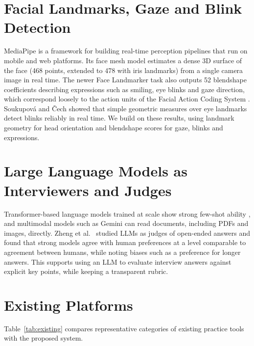 \documentclass[12pt,a4paper,oneside]{report}
\begin{document}
\section{Facial Landmarks, Gaze and Blink Detection}
MediaPipe \cite{lugaresi2019} is a framework for building real-time perception pipelines that run on mobile and web platforms. Its face mesh model \cite{kartynnik2019} estimates a dense 3D surface of the face (468 points, extended to 478 with iris landmarks) from a single camera image in real time. The newer Face Landmarker task also outputs 52 blendshape coefficients describing expressions such as smiling, eye blinks and gaze direction, which correspond loosely to the action units of the Facial Action Coding System \cite{ekman1978}. Soukupov\'{a} and \v{C}ech \cite{soukupova2016} showed that simple geometric measures over eye landmarks detect blinks reliably in real time. We build on these results, using landmark geometry for head orientation and blendshape scores for gaze, blinks and expressions.

\section{Large Language Models as Interviewers and Judges}
Transformer-based language models \cite{vaswani2017} trained at scale show strong few-shot ability \cite{brown2020}, and multimodal models such as Gemini \cite{gemini2023} can read documents, including PDFs and images, directly. Zheng et al.\ \cite{zheng2023} studied LLMs as judges of open-ended answers and found that strong models agree with human preferences at a level comparable to agreement between humans, while noting biases such as a preference for longer answers. This supports using an LLM to evaluate interview answers against explicit key points, while keeping a transparent rubric.

\section{Existing Platforms}
Table~\ref{tab:existing} compares representative categories of existing practice tools with the proposed system.
\end{document}
